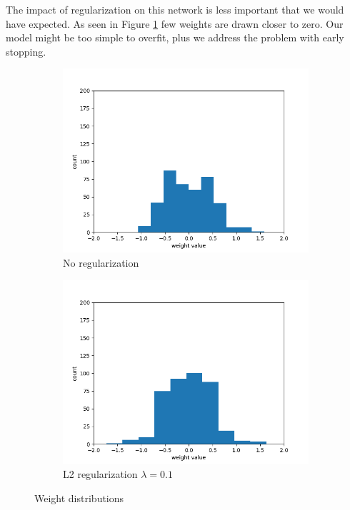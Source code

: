 \documentclass[a4paper]{article}
\begin{document}
The impact of regularization on this network is less important that we would have expected. As seen in Figure \ref{fig:weight_histogram} few weights are drawn closer to zero. Our model might be too simple to overfit, plus we address the problem with early stopping. 


\begin{figure}[hb]
	\begin{subfigure}{.5\linewidth}
		\includegraphics[width=.6\linewidth]{img/4_1_weight_histogram_0.png}
		\centering
		\caption{\small No regularization}
	\end{subfigure}
	\begin{subfigure}{.5\linewidth}
		\centering
		\includegraphics[width=.6\linewidth]{img/4_1_weight_histogram_0_1.png}
		\caption{\small L2 regularization $\lambda = 0.1$}
	\end{subfigure}
	\caption{Weight distributions}
	\label{fig:weight_histogram}
\end{figure}
\end{document}
